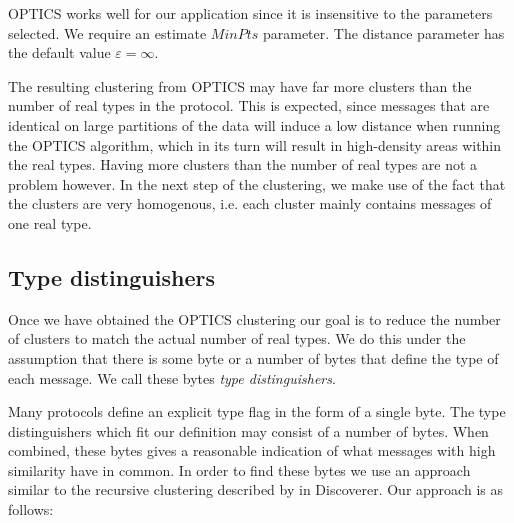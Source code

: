 \documentclass[a4paper]{report}
\begin{document}
OPTICS works well for our application since it is insensitive to the parameters
selected. We require an estimate $MinPts$ parameter. The distance parameter
has the default value $\varepsilon = \infty$.

The resulting clustering from OPTICS may have far more clusters than the number
of real types in the protocol. This is expected, since messages that are
identical on large partitions of the data will induce a low distance when
running the OPTICS algorithm, which in its turn will result in high-density
areas within the real types. Having more clusters than the number of real
types are not a problem however. In the next step of the clustering, we make
use of the fact that the clusters are very homogenous, i.e. each cluster mainly
contains messages of one real type.

\subsection{Type distinguishers}
Once we have obtained the OPTICS clustering our goal is to reduce the number of
clusters to match the actual number of real types. We do this under the
assumption that there is some byte or a number of bytes that define the type of
each message. We call these bytes \emph{type distinguishers}. 

Many protocols define an explicit type flag in the form of a single byte. The
type distinguishers which fit our definition may consist of a number of bytes.
When combined, these bytes gives a reasonable indication of what messages with
high similarity have in common. In order to find these bytes we use an approach
similar to the recursive clustering described by \citeauthor{cui07} in
Discoverer. Our approach is as follows:
\end{document}
